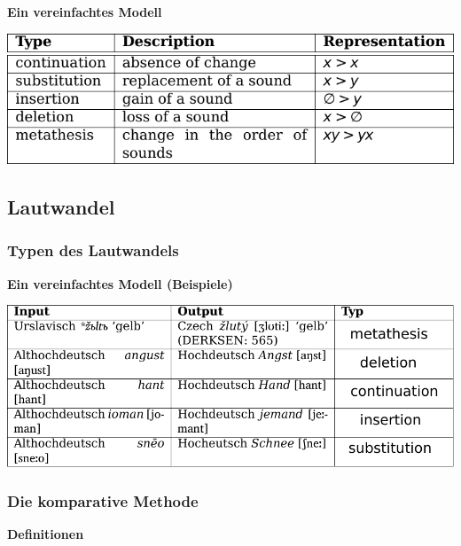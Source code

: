 \vspace{0.5cm}\par\noindent\textbf{Ein vereinfachtes Modell}\vspace{0.5cm}

\includegraphics[width=\textwidth]{img/indel.pdf}

\subsection{\texorpdfstring{{Lautwandel}}{Lautwandel}}

\subsubsection{\texorpdfstring{{Typen des
Lautwandels}}{Typen des Lautwandels}}

\vspace{0.5cm}\par\noindent\textbf{Ein vereinfachtes Modell (Beispiele)}\vspace{0.5cm}

\includegraphics[width=\textwidth]{img/indel-concrete.pdf}


\subsubsection{\texorpdfstring{{Die komparative
Methode}}{Die komparative Methode}}

\vspace{0.5cm}\par\noindent\textbf{Definitionen}\vspace{0.5cm}

